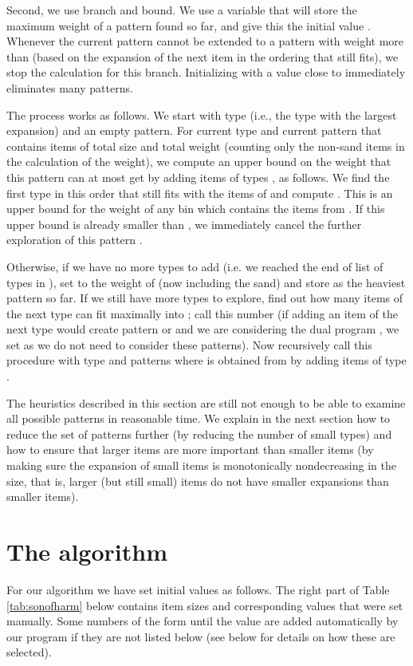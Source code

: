 Second, we use branch and bound. We use a variable  that will store the maximum weight of a pattern found so far,
and give this the initial value . Whenever the current pattern cannot be extended to a pattern with weight more than
 (based on the expansion of the next item in the ordering  that still fits), we stop the calculation for
this branch. Initializing  with a value close to  immediately eliminates many patterns.

The process works as follows.
We start with type  (i.e., the type with the largest expansion) and an empty pattern.
For current type  and current pattern  that contains items of total size  and total weight  (counting only the non-sand items in the calculation of the weight), we compute an upper bound on the weight that this pattern  can at most get by adding items of types , as follows. We find the first type  in this order that still fits with the items of  and compute . This is an upper bound for the weight of any bin which contains the items from . If this upper bound is already smaller than , we immediately cancel the further exploration of this pattern .

Otherwise, if we have no more types to add (i.e. we reached the end of list of types in ), set  to the weight of  (now including the sand) and store  as the heaviest pattern so far. If we still have more types to explore, find out how many items of the next type can fit maximally into ; call this number  (if adding an item of the next type would create pattern  or  and we are considering the dual program , we set  as we do not need to consider these patterns). Now recursively call this procedure with type  and patterns  where  is obtained from  by adding  items of type .

The heuristics described in this section are still not enough to be able to examine all possible patterns in reasonable time. We explain in the next section how to reduce the set of patterns further (by reducing the number of small types) and how to ensure that larger items are more important than smaller items (by making sure the expansion of small items is monotonically nondecreasing in the size, that is, larger (but still small) items do not have smaller expansions than smaller items).

\section{The algorithm \SonofH}

For our algorithm {\SonofH} we have set initial values as follows.
The right part of Table \ref{tab:sonofharm} below contains item sizes and corresponding 
values that were set manually.
Some numbers of the form  until the value  are added automatically
by our program if they are not listed below (see below for details on how these are selected).

